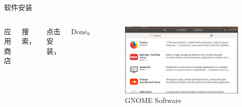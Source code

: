 \documentclass[UTF8]{ctexbeamer}
\begin{document}
\begin{frame}{软件安装}

    \begin{columns}
    
        
        应用商店
        
        搜索，

        点击安装，

        Done。
        
        \begin{figure}
            \centering
            \includegraphics[width=\textwidth]{gnome-install.png}
            \caption{GNOME Software}
        \end{figure}
    \end{columns}
    
\end{frame}
\end{document}
